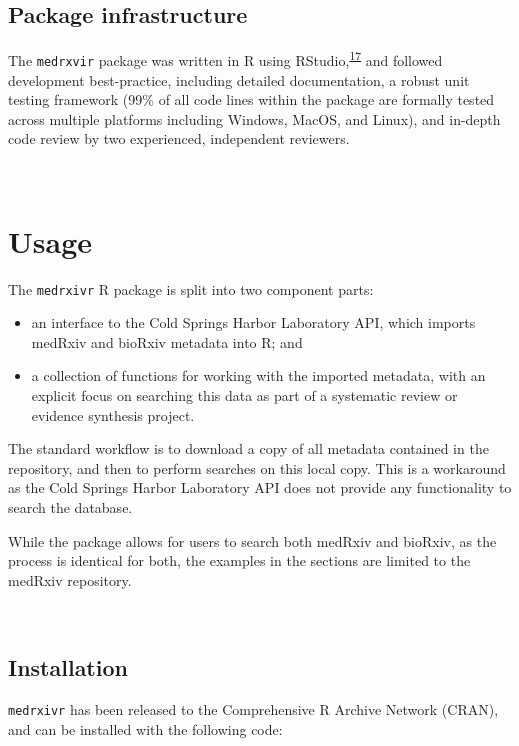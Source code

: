 \documentclass[a4paper, twoside]{templates/ociamthesis}
\providecommand{\tightlist}{%
  \setlength{\itemsep}{0pt}\setlength{\parskip}{0pt}}
\begin{document}
\hypertarget{package-infrastructure}{%
\subsection{Package infrastructure}\label{package-infrastructure}}

The \texttt{medrxvir} package was written in R using RStudio,\textsuperscript{\protect\hyperlink{ref-rcoreteam2019}{17}} and followed development best-practice, including detailed documentation, a robust unit testing framework (99\% of all code lines within the package are formally tested across multiple platforms including Windows, MacOS, and Linux), and in-depth code review by two experienced, independent reviewers.

~

\hypertarget{usage}{%
\section{Usage}\label{usage}}

The \texttt{medrxivr} R package is split into two component parts:

\begin{itemize}
\tightlist
\item
  an interface to the Cold Springs Harbor Laboratory API, which imports medRxiv and bioRxiv metadata into R; and
\item
  a collection of functions for working with the imported metadata, with an explicit focus on searching this data as part of a systematic review or evidence synthesis project.
\end{itemize}

The standard workflow is to download a copy of all metadata contained in the repository, and then to perform searches on this local copy. This is a workaround as the Cold Springs Harbor Laboratory API does not provide any functionality to search the database.

While the package allows for users to search both medRxiv and bioRxiv, as the process is identical for both, the examples in the sections are limited to the medRxiv repository.

~

\hypertarget{installation}{%
\subsection{Installation}\label{installation}}

\texttt{medrxivr} has been released to the Comprehensive R Archive Network (CRAN), and can be installed with the following code:
\end{document}
